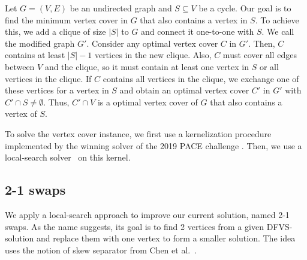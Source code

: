 Let $G = (V,E)$ be an undirected graph and $S \subseteq V$ be a cycle. Our goal is to find the minimum vertex cover in $G$ that also contains a vertex in $S$. To achieve this, we add a clique of size $|S|$ to $G$ and connect it one-to-one with $S$. We call the modified graph $G'$.
Consider any optimal vertex cover $C$ in $G'$. Then, $C$ contains at least $|S|-1$ vertices in the new clique.
Also, $C$ must cover all edges between $V$ and the clique, so it must contain at least one vertex in $S$ or all vertices in the clique.
If $C$ contains all vertices in the clique, we exchange one of these vertices for a vertex in $S$ and obtain an optimal vertex cover $C'$ in $G'$ with $C' \cap S \neq \emptyset$.
Thus, $C'\cap V$ is a optimal vertex cover of $G$ that also contains a vertex of $S$.

To solve the vertex cover instance, we first use a kernelization procedure implemented by the winning solver of the 2019 PACE challenge \cite{Hespe2020WeGotYouCoveredTW}.
Then, we use a local-search solver~\cite{Cai2013NuMVCAE} on this kernel.

%

\subsection{2-1 swaps}
We apply a local-search approach to improve our current solution, named 2-1 swaps. As the name suggests, its goal is to find 2 vertices from a given DFVS-solution and replace them with one vertex to form a smaller solution. The idea uses the notion of skew separator from Chen et al.~\cite{Chen2008AFA}. 

